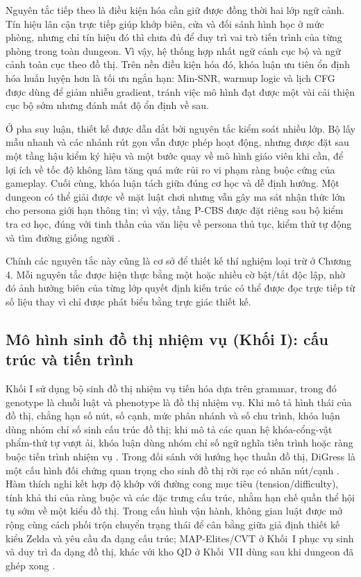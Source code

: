 \documentclass[oneside,a4paper,12pt]{extreport}
\begin{document}
Nguyên tắc tiếp theo là điều kiện hóa cần giữ được đồng thời hai lớp ngữ cảnh. Tín hiệu lân cận trực tiếp giúp khớp biên, cửa và đối sánh hình học ở mức phòng, nhưng chỉ tín hiệu đó thì chưa đủ để duy trì vai trò tiến trình của từng phòng trong toàn dungeon. Vì vậy, hệ thống hợp nhất ngữ cảnh cục bộ và ngữ cảnh toàn cục theo đồ thị. Trên nền điều kiện hóa đó, khóa luận ưu tiên ổn định hóa huấn luyện hơn là tối ưu ngắn hạn: Min-SNR, warmup logic và lịch CFG được dùng để giảm nhiễu gradient, tránh việc mô hình đạt được một vài cải thiện cục bộ sớm nhưng đánh mất độ ổn định về sau.

Ở pha suy luận, thiết kế được dẫn dắt bởi nguyên tắc kiểm soát nhiều lớp. Bộ lấy mẫu nhanh và các nhánh rút gọn vẫn được phép hoạt động, nhưng được đặt sau một tầng hậu kiểm ký hiệu và một bước quay về mô hình giáo viên khi cần, để lợi ích về tốc độ không làm tăng quá mức rủi ro vi phạm ràng buộc cứng của gameplay. Cuối cùng, khóa luận tách giữa đúng cơ học và dễ định hướng. Một dungeon có thể giải được về mặt luật chơi nhưng vẫn gây ma sát nhận thức lớn cho persona giới hạn thông tin; vì vậy, tầng P-CBS được đặt riêng sau bộ kiểm tra cơ học, đúng với tinh thần của văn liệu về persona thủ tục, kiểm thử tự động và tìm đường giống người \cite{holmgard2018proceduralpersonas,ariyurek2023beyondpersonas,rahmani2022humanlikepath,dubey2022cognitivepath}.

Chính các nguyên tắc này cũng là cơ sở để thiết kế thí nghiệm loại trừ ở Chương 4. Mỗi nguyên tắc được hiện thực bằng một hoặc nhiều cờ bật/tắt độc lập, nhờ đó ảnh hưởng biên của từng lớp quyết định kiến trúc có thể được đọc trực tiếp từ số liệu thay vì chỉ được phát biểu bằng trực giác thiết kế.

\subsection{Mô hình sinh đồ thị nhiệm vụ (Khối I): cấu trúc và tiến trình}
Khối I sử dụng bộ sinh đồ thị nhiệm vụ tiến hóa dựa trên grammar, trong đó genotype là chuỗi luật và phenotype là đồ thị nhiệm vụ. Khi mô tả hình thái của đồ thị, chẳng hạn số nút, số cạnh, mức phân nhánh và số chu trình, khóa luận dùng nhóm chỉ số sinh cấu trúc đồ thị; khi mô tả các quan hệ khóa-cổng-vật phẩm-thứ tự vượt ải, khóa luận dùng nhóm chỉ số ngữ nghĩa tiến trình hoặc ràng buộc tiến trình nhiệm vụ \cite{dormans2011missionspaces,mota2021dungeon,kahn1962topological}. Trong đối sánh với hướng học thuần đồ thị, DiGress là một cấu hình đối chứng quan trọng cho sinh đồ thị rời rạc có nhãn nút/cạnh \cite{vignac2023digress}. Hàm thích nghi kết hợp độ khớp với đường cong mục tiêu (tension/difficulty), tính khả thi của ràng buộc và các đặc trưng cấu trúc, nhằm hạn chế quần thể hội tụ sớm về một kiểu đồ thị. Trong cấu hình vận hành, không gian luật được mở rộng cùng cách phối trộn chuyển trạng thái để cân bằng giữa giả định thiết kế kiểu Zelda và yêu cầu đa dạng cấu trúc; MAP-Elites/CVT ở Khối~I phục vụ sinh và duy trì đa dạng đồ thị, khác với kho QD ở Khối~VII dùng sau khi dungeon đã ghép xong \cite{mouret2015mapelites,vassiliades2017cvt,fontaine2020cma}.
\end{document}
